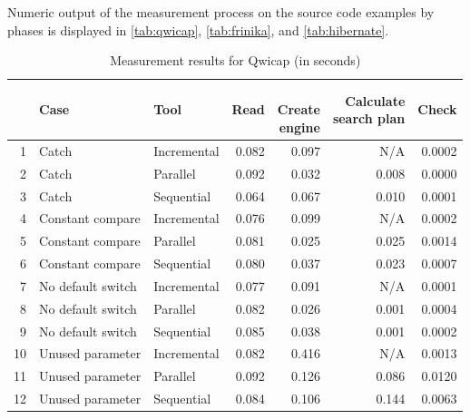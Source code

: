 Numeric output of the measurement process on the source code examples by phases is displayed in \autoref{tab:qwicap}, \autoref{tab:frinika}, and \autoref{tab:hibernate}.


\begin{table}[!htb]
	\centering
	\begin{tabular}{rllrrrr}
		\hline
		& Case & Tool & Read & \shortstack{\\Create\\engine} & \shortstack{Calculate\\search plan} & Check \\ 
		\hline \hline
		1 & Catch & Incremental & 0.082 & 0.097 & N/A & 0.0002 \\ 
		2 & Catch & Parallel & 0.092 & 0.032 & 0.008 & 0.0000 \\ 
		3 & Catch & Sequential & 0.064 & 0.067 & 0.010 & 0.0001 \\ 
		\hline
		4 & Constant compare & Incremental & 0.076 & 0.099 & N/A & 0.0002 \\ 
		5 & Constant compare & Parallel & 0.081 & 0.025 & 0.025 & 0.0014 \\ 
		6 & Constant compare & Sequential & 0.080 & 0.037 & 0.023 & 0.0007 \\ 
		\hline
		7 & No default switch & Incremental & 0.077 & 0.091 & N/A & 0.0001 \\ 
		8 & No default switch & Parallel & 0.082 & 0.026 & 0.001 & 0.0004 \\ 
		9 & No default switch & Sequential & 0.085 & 0.038 & 0.001 & 0.0002 \\ 
		\hline
		10 & Unused parameter & Incremental & 0.082 & 0.416 & N/A & 0.0013 \\ 
		11 & Unused parameter & Parallel & 0.092 & 0.126 & 0.086 & 0.0120 \\ 
		12 & Unused parameter & Sequential & 0.084 & 0.106 & 0.144 & 0.0063 \\ 
		\hline
	\end{tabular}
	\caption{Measurement results for Qwicap (in seconds)} 
	\label{tab:qwicap}
\end{table}

